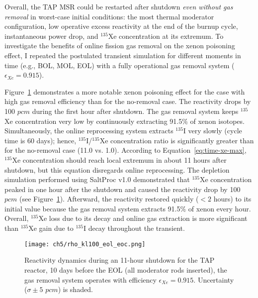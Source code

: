 
Overall, the \gls{TAP} \gls{MSR} could be restarted after shutdown \emph{even 
without gas removal} in worst-case initial conditions: the most thermal 
moderator configuration, low operative excess reactivity at the end of the 
burnup cycle, instantaneous power drop, and $^{135}$Xe concentration at its 
extremum. To investigate the benefits of online fission gas removal on the 
xenon poisoning effect, I repeated the postulated transient simulation for 
different moments in time (e.g., \gls{BOL}, MOL, \gls{EOL}) with a fully 
operational gas removal system ($\epsilon_{Xe}=0.915$). 

Figure~\ref{fig:lf-tap-rho-kl100-eol-eoc} demonstrates a more notable xenon 
poisoning effect for the case with high gas removal efficiency than for 
the no-removal case. The reactivity drops by 100 $pcm$ during the 
first hour after shutdown. The gas removal system keeps $^{135}$Xe 
concentration very low by continuously extracting 91.5\% of xenon isotopes. 
Simultaneously, the online reprocessing system extracts $^{135}$I very slowly 
(cycle time is 60 days); hence, $^{135}$I/$^{135}$Xe concentration ratio is 
significantly greater than for the no-removal case (11.0 vs. 1.0). According 
to Equation~\ref{eq:time-xe-max}, $^{135}$Xe concentration should reach local 
extremum in about 11 hours after shutdown, but this equation disregards online 
reprocessing. The depletion simulation performed using SaltProc v1.0 
demonstrated that $^{135}$Xe concentration peaked in one hour after the 
shutdown and caused the reactivity drop by 100 $pcm$ (see 
Figure~\ref{fig:lf-tap-rho-kl100-eol-eoc}). Afterward, 
the reactivity restored quickly ($<2$ hours) to its initial value because 
the gas removal system extracts 91.5\% of xenon every hour. Overall, 
$^{135}$Xe loss due to its decay and online gas extraction is more significant 
than $^{135}$Xe gain due to $^{135}$I decay throughout the transient.
\begin{figure}[htp!] %
	\centering
	\texttt{[image: ch5/rho\_kl100\_eol\_eoc.png]}
	\vspace{-5mm}
	\caption{Reactivity dynamics during an 11-hour shutdown for the 
		\gls{TAP} reactor, 10 days before the \gls{EOL} (all moderator rods 
		inserted), the gas removal system operates with efficiency 
		$\epsilon_{Xe}=0.915$. Uncertainty ($\sigma\pm5$ $pcm$) is 
		shaded.}
	\label{fig:lf-tap-rho-kl100-eol-eoc}
\end{figure}

